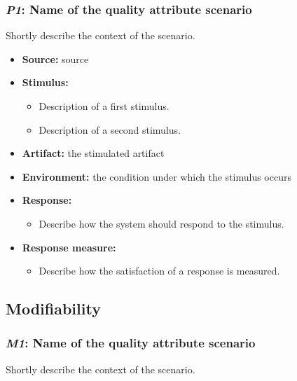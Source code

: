\documentclass[a4paper,10pt]{article}
\begin{document}
\subsubsection{\emph{P1}: Name of the quality attribute scenario}
Shortly describe the context of the scenario.

\begin{itemize}
    \item \textbf{Source:} source
    \item \textbf{Stimulus:}
        \begin{itemize}
            \item Description of a first stimulus.
            \item Description of a second stimulus.
        \end{itemize}

    \item \textbf{Artifact:} the stimulated artifact
    \item \textbf{Environment:} the condition under which the stimulus occurs
    \item \textbf{Response:}
        \begin{itemize}
            \item Describe how the system should respond to the stimulus.
        \end{itemize}

    \item \textbf{Response measure:}
        \begin{itemize}
            \item Describe how the satisfaction of a response is measured.
        \end{itemize}
\end{itemize}

\subsection{Modifiability}
\subsubsection{\emph{M1}: Name of the quality attribute scenario}
Shortly describe the context of the scenario.
\end{document}
